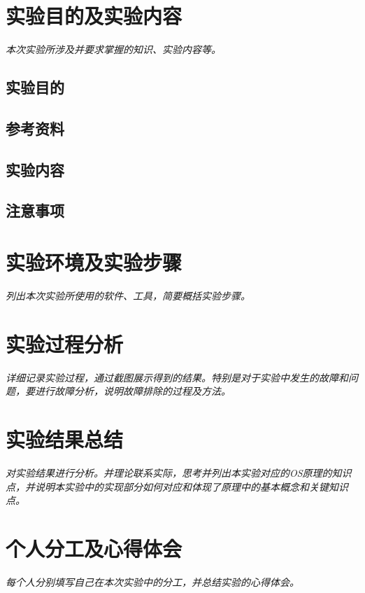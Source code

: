 \documentclass{whureport}
\begin{document}
\makeheader
\section{实验目的及实验内容}
\textit{本次实验所涉及并要求掌握的知识、实验内容等。}

\subsection{实验目的}



\subsection{参考资料}



\subsection{实验内容}



\subsection{注意事项}



\section{实验环境及实验步骤}
\textit{列出本次实验所使用的软件、工具，简要概括实验步骤。}




\section{实验过程分析}
\textit{详细记录实验过程，通过截图展示得到的结果。特别是对于实验中发生的故障和问题，要进行故障分析，说明故障排除的过程及方法。}




\section{实验结果总结}
\textit{对实验结果进行分析。并理论联系实际，思考并列出本实验对应的OS原理的知识点，并说明本实验中的实现部分如何对应和体现了原理中的基本概念和关键知识点。}




\section{个人分工及心得体会}
\textit{每个人分别填写自己在本次实验中的分工，并总结实验的心得体会。}
\end{document}
